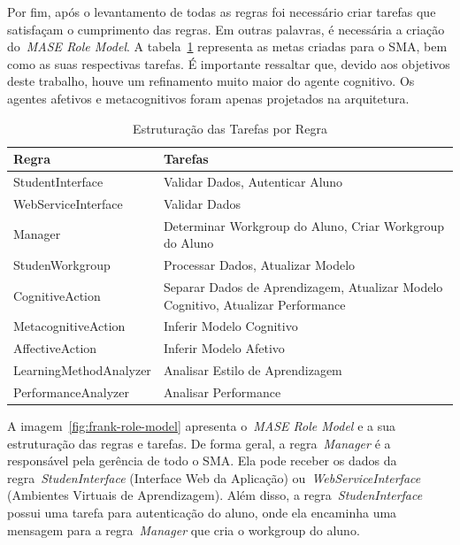Por fim, após o levantamento de todas as regras foi necessário criar tarefas que satisfaçam o cumprimento das regras. Em outras palavras, é necessária a criação do~\emph{MASE Role Model}. A tabela~\ref{tabela:mase-role-model} representa as metas criadas para o SMA, bem como as suas respectivas tarefas. É importante ressaltar que, devido aos objetivos deste trabalho, houve um refinamento muito maior do agente cognitivo. Os agentes afetivos e metacognitivos foram apenas projetados na arquitetura.

\begin{table}
	\caption{Estruturação das Tarefas por Regra}
	\begin{tabular}{|p{5cm} | p{9cm}|}
		\hline
		\textbf{Regra}		& \textbf{Tarefas} \\
		\hline
		StudentInterface 	& Validar Dados, Autenticar Aluno  \\
		\hline
		WebServiceInterface 	& Validar Dados  \\
		\hline
		Manager 		& Determinar Workgroup do Aluno, Criar Workgroup do Aluno  \\ %
		\hline
		StudenWorkgroup 	& Processar Dados, Atualizar Modelo   \\
		\hline
		CognitiveAction 	& Separar Dados de Aprendizagem, Atualizar Modelo Cognitivo, Atualizar Performance  \\
		\hline
		MetacognitiveAction 	& Inferir Modelo Cognitivo  \\
		\hline
		AffectiveAction 	& Inferir Modelo Afetivo  \\
		\hline
		LearningMethodAnalyzer 	& Analisar Estilo de Aprendizagem  \\
		\hline
		PerformanceAnalyzer 	& Analisar Performance  \\
		\hline
	\end{tabular}
	\label{tabela:mase-role-model}
\end{table}

A imagem~\ref{fig:frank-role-model} apresenta o~\emph{MASE Role Model} e a sua estruturação das regras e tarefas. De forma geral, a regra~\emph{Manager} é a responsável pela gerência de todo o SMA. Ela pode receber os dados da regra~\emph{StudenInterface} (Interface Web da Aplicação) ou~\emph{WebServiceInterface} (Ambientes Virtuais de Aprendizagem). Além disso, a regra~\emph{StudenInterface} possui uma tarefa para autenticação do aluno, onde ela encaminha uma mensagem para a regra~\emph{Manager} que cria o workgroup do aluno.

